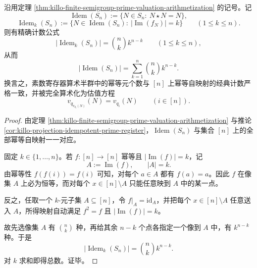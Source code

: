 \begin{theorem}[素数寄存器算术半群的幂等元精确计数]\label{thm:xi-prime-register-idempotent-exact-count}
沿用定理 \ref{thm:killo-finite-semigroup-prime-valuation-arithmetization} 的记号。记
\[
\operatorname{Idem}(S_n):=\{N\in S_n:\ N\star N=N\},
\]
\[
\operatorname{Idem}_k(S_n):=
\{N\in \operatorname{Idem}(S_n):\ |\operatorname{Im}(f_N)|=k\}
\qquad (1\le k\le n).
\]
则有精确计数公式
\[
\boxed{\;
\bigl|\operatorname{Idem}_k(S_n)\bigr|=\binom{n}{k}k^{n-k}
\qquad (1\le k\le n),
\;}
\]
从而
\[
\boxed{\;
\bigl|\operatorname{Idem}(S_n)\bigr|
=
\sum_{k=1}^{n}\binom{n}{k}k^{n-k}.
\;}
\]
换言之，素数寄存器算术半群中的幂等元个数与 \([n]\) 上幂等自映射的经典计数严格一致，并被完全算术化为估值方程
\[
v_{q_{v_{q_i}(N)}}(N)=v_{q_i}(N)\qquad (i\in[n]).
\]
\end{theorem}
\begin{proof}
由定理 \ref{thm:killo-finite-semigroup-prime-valuation-arithmetization} 与推论 \ref{cor:killo-projection-idempotent-prime-register}，\(\operatorname{Idem}(S_n)\) 与集合 \([n]\) 上的全部幂等自映射一一对应。

固定 \(k\in\{1,\dots,n\}\)。若 \(f:[n]\to[n]\) 幂等且 \(|\operatorname{Im}(f)|=k\)，记
\[
A:=\operatorname{Im}(f),\qquad |A|=k.
\]
由幂等性 \(f(f(i))=f(i)\) 可知，对每个 \(a\in A\) 都有 \(f(a)=a\)。因此 \(f\) 在像集 \(A\) 上必为恒等，而对每个 \(x\in[n]\setminus A\) 只能任意映到 \(A\) 中的某一点。

反之，任取一个 \(k\)-元子集 \(A\subseteq[n]\)，令 \(f|_A=\mathrm{id}_A\)，并把每个 \(x\in[n]\setminus A\) 任意送入 \(A\)，所得映射自动满足 \(f^2=f\) 且 \(|\operatorname{Im}(f)|=k\)。

故先选像集 \(A\) 有 \(\binom{n}{k}\) 种，再给其余 \(n-k\) 个点各指定一个像到 \(A\) 中，有 \(k^{n-k}\) 种。于是
\[
\bigl|\operatorname{Idem}_k(S_n)\bigr|=\binom{n}{k}k^{n-k}.
\]
对 \(k\) 求和即得总数。证毕。
\end{proof}

